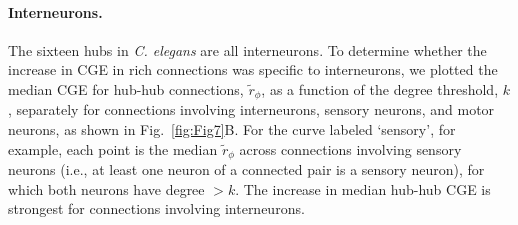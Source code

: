 \documentclass[10pt,letterpaper]{article}
\begin{document}
\paragraph{Interneurons.}
The sixteen hubs in \textit{C. elegans} are all interneurons.
To determine whether the increase in CGE in rich connections was specific to interneurons, we plotted the median CGE for hub-hub connections, $\tilde{r}_\phi$, as a function of the degree threshold, $k$, separately for connections involving interneurons, sensory neurons, and motor neurons, as shown in Fig.~\ref{fig:Fig7}B.
For the curve labeled `sensory', for example, each point is the median $\tilde{r}_\phi$ across connections involving sensory neurons (i.e., at least one neuron of a connected pair is a sensory neuron), for which both neurons have degree $>k$.
The increase in median hub-hub CGE is strongest for connections involving interneurons.
\end{document}
